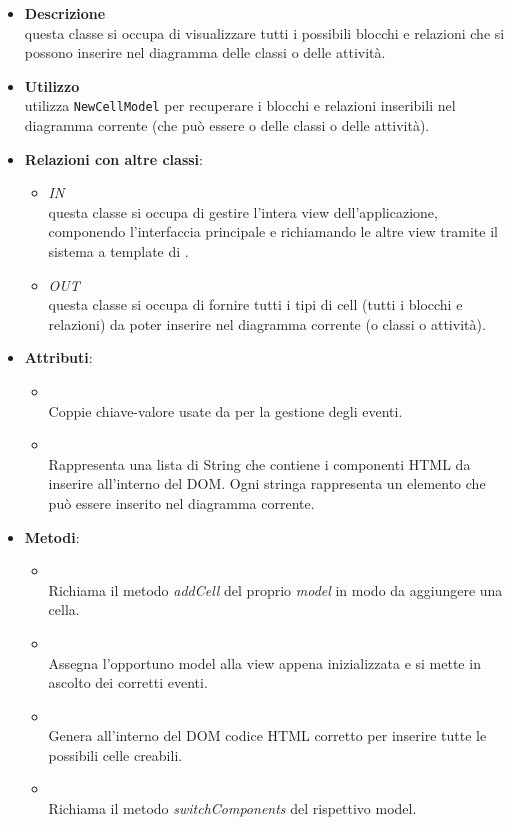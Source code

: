 \begin{itemize}
\item \textbf{Descrizione}\\
questa classe si occupa di visualizzare tutti i possibili blocchi e relazioni che si possono inserire nel diagramma delle classi o delle attività.
\item \textbf{Utilizzo}\\
utilizza \texttt{NewCellModel} per recuperare i blocchi e relazioni inseribili nel diagramma corrente (che può essere o delle classi o delle attività).
\item \textbf{Relazioni con altre classi}:
\begin{itemize}
\item \textit{IN} \hyperref[\nogloxy{swedesigner::client::view::AppView}]{}\\
questa classe si occupa di gestire l'intera view dell'applicazione, componendo l'interfaccia principale e richiamando le altre view tramite il sistema a template di \backbonejs{}.
\item \textit{OUT} \hyperref[\nogloxy{swedesigner::client::model::NewCellModel}]{}\\
questa classe si occupa di fornire tutti i tipi di cell (tutti i blocchi e relazioni) da poter inserire nel diagramma corrente (o classi o attività).
\end{itemize}
\item \textbf{Attributi}:
\begin{itemize}
\item {}
\\ Coppie chiave-valore usate da \backbonejs{} per la gestione degli eventi.
\item {}
\\ Rappresenta una lista di String che contiene i componenti HTML da inserire all'interno del DOM. Ogni stringa rappresenta un elemento che può essere inserito nel diagramma corrente.
\end{itemize}
\item \textbf{Metodi}:
\begin{itemize}
\item {}
\\ Richiama il metodo \emph{addCell} del proprio \emph{model} in modo da aggiungere una cella.
\item {}
\\ Assegna l'opportuno model alla view appena inizializzata e si mette in ascolto dei corretti eventi.
\item {}
\\ Genera all'interno del DOM codice HTML corretto per inserire tutte le possibili celle creabili. 
\item {}
\\ Richiama il metodo \emph{switchComponents} del rispettivo model.
\end{itemize}
\end{itemize}

